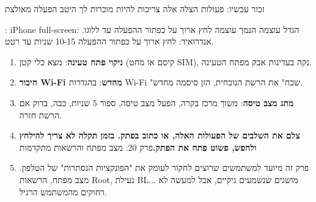 \begin{tcbwarn}{זכור עכשיו: פעולות הצלה אלה צריכות להיות מוכרות לך היטב}
הפעלה מאולצת

\end{tcbwarn}

\begin{tcbpractice}{: iPhone full-screen: הגדל עוצמה הנמך עוצמה לחץ ארוך על כפתור ההפעלה עד ללוגו. אנדרואיד: לחץ ארוך על כפתור ההפעלה 10-15 שניות עד רטט.}
\begin{enumerate}
  \item \textbf{ניקוי פתח טעינה}: מצא כלי קטן (קיסם או מחט SIM), נקה בעדינות אבק מפתח הטעינה.
  \item \textbf{חיבור Wi-Fi מחדש}: בהגדרות Wi-Fi "שכח" את הרשת הנוכחית, הזן סיסמה מחדש.
  \item \textbf{מתג מצב טיסה}: משוך מרכז בקרה, הפעל מצב טיסה, ספור 5 שניות, כבה, בדוק אם הרשת חזרה.
  \item \textbf{צלם את השלבים של הפעולות האלה, או כתוב בפתק. בזמן תקלה לא צריך להילחץ ולחפש, פשוט פתח את הפתק.}פרק 20: מצב מפתח והרשאות מתקדמות
  \item פרק זה מיועד למשתמשים שרוצים לחקור לעומק את "הפונקציות הנסתרות" של הטלפון. מצב מפתח, הרשאות Root, נעילת BL... מושגים שנשמעים גיקיים, אבל למעשה לא רחוקים מהמשתמש הרגיל.
\end{enumerate}

\end{tcbpractice}
